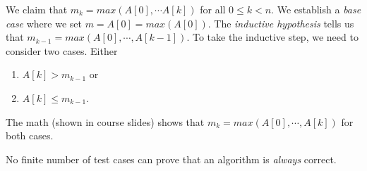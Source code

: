 \documentclass[titlepage, 12pt, leqno]{article}
\begin{document}
We claim that $m_{k} = max(A[0], \cdots A[k])$ for all $0 \le k < n$. We 
establish a \textit{base case} where we set $m = A[0] = max(A[0])$. The
\textit{inductive hypothesis} tells us that 
$m_{k-1} = max(A[0], \cdots ,A[k-1])$. To take the inductive step, we need to 
consider two cases. Either
\begin{enumerate}
    \item $A[k] > m_{k-1}$ or
    \item $A[k] \le m_{k-1}$.
\end{enumerate}

The math (shown in course slides) shows that $m_{k} = max(A[0], \cdots ,A[k])$
for both cases.
\begin{note}
    No finite number of test cases can prove that an algorithm is \textit{always}
    correct.
\end{note}
\end{document}

